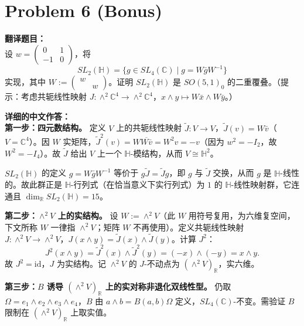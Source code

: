 \documentclass{ctexart}
\begin{document}
\vspace{2em}
\section*{Problem 6 (Bonus)}
\textbf{翻译题目：}\\
设 $w = \begin{pmatrix} 0 & 1 \\ -1 & 0 \end{pmatrix}$，将
\[
SL_2(\mathbb{H}) = \Big\{ g \in SL_4(\mathbb{C}) \;\Big|\; g = W \bar{g} W^{-1} \Big\}
\]
实现，其中 $W := \begin{pmatrix} w & \\ & w \end{pmatrix}$。证明 $SL_2(\mathbb{H})$ 是 $SO(5,1)_0$ 的二重覆叠。（提示：考虑共轭线性映射 $J: \wedge^{2} \mathbb{C}^{4} \to \wedge^{2} \mathbb{C}^{4}$，$x \wedge y \mapsto W\bar{x} \wedge W\bar{y}$。）

\vspace{1em}
\textbf{详细的中文作答：}\\
\textbf{第一步：四元数结构。} 定义 $V$ 上的共轭线性映射 $\tilde{J}: V \to V$，$\tilde{J}(v) = W \bar{v}$（$V = \mathbb{C}^{4}$）。因 $W$ 实矩阵，$\tilde{J}^{2}(v) = W \overline{W \bar v} = W^{2} v = -v$（因为 $w^{2} = -I_{2}$，故 $W^{2} = -I_{4}$）。故 $\tilde{J}$ 给出 $V$ 上一个 $\mathbb{H}$-模结构，从而 $V \cong \mathbb{H}^{2}$。

$SL_{2}(\mathbb{H})$ 的定义 $g = W\bar{g}W^{-1}$ 等价于 $g \tilde{J} = \tilde{J} g$，即 $g$ 与 $\tilde{J}$ 交换，从而 $g$ 是 $\mathbb{H}$-线性的。故此群正是 $\mathbb{H}$-行列式（在恰当意义下实行列式）为 $1$ 的 $\mathbb{H}$-线性映射群，它连通且 $\dim_{\mathbb{R}} SL_2(\mathbb{H}) = 15$。

\textbf{第二步：$\wedge^{2} V$ 上的实结构。} 设 $W := \wedge^{2} V$（此 $W$ 用符号复用，为六维复空间，下文所称 $W$ 一律指 $\wedge^2 V$；矩阵 $W$ 不再使用）。定义共轭线性映射 $J: \wedge^{2} V \to \wedge^{2} V$，$J(x \wedge y) = \tilde{J}(x) \wedge \tilde{J}(y)$。计算 $J^{2}$：
\[
J^{2}(x \wedge y) = \tilde{J}^{2}(x) \wedge \tilde{J}^{2}(y) = (-x) \wedge (-y) = x \wedge y.
\]
故 $J^{2} = \mathrm{id}$，$J$ 为实结构。记 $\wedge^{2} V$ 的 $J$-不动点为 $(\wedge^{2} V)_{\mathbb{R}}$，实六维。

\textbf{第三步：$B$ 诱导 $(\wedge^{2} V)_{\mathbb{R}}$ 上的实对称非退化双线性型。} 仍取 $\Omega = e_1 \wedge e_2 \wedge e_3 \wedge e_4$，$B$ 由 $a \wedge b = B(a, b) \Omega$ 定义，$SL_4(\mathbb{C})$-不变。需验证 $B$ 限制在 $(\wedge^{2} V)_{\mathbb{R}}$ 上取实值。
\end{document}
